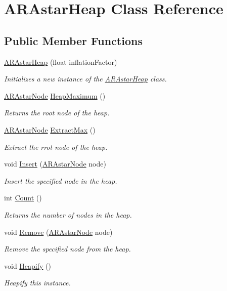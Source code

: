 \hypertarget{class_a_r_astar_heap}{\section{A\-R\-Astar\-Heap Class Reference}
\label{class_a_r_astar_heap}
}
\subsection*{Public Member Functions}
\begin{DoxyCompactItemize}
\item 
\hyperlink{class_a_r_astar_heap_a699bf0a23b37f6f30ff2c04d2d445740}{A\-R\-Astar\-Heap} (float inflation\-Factor)
\begin{DoxyCompactList}\small\item\em Initializes a new instance of the \hyperlink{class_a_r_astar_heap}{A\-R\-Astar\-Heap} class. \end{DoxyCompactList}\item 
\hyperlink{class_a_r_astar_node}{A\-R\-Astar\-Node} \hyperlink{class_a_r_astar_heap_aeb5fa05fb217b9650d2cd62b105b9a25}{Heap\-Maximum} ()
\begin{DoxyCompactList}\small\item\em Returns the root node of the heap. \end{DoxyCompactList}\item 
\hyperlink{class_a_r_astar_node}{A\-R\-Astar\-Node} \hyperlink{class_a_r_astar_heap_a535db2f13d9af1e23757671601ad0f70}{Extract\-Max} ()
\begin{DoxyCompactList}\small\item\em Extract the rrot node of the heap. \end{DoxyCompactList}\item 
void \hyperlink{class_a_r_astar_heap_a3ec8e0df935cb41937a202061caac700}{Insert} (\hyperlink{class_a_r_astar_node}{A\-R\-Astar\-Node} node)
\begin{DoxyCompactList}\small\item\em Insert the specified node in the heap. \end{DoxyCompactList}\item 
int \hyperlink{class_a_r_astar_heap_a9ee6d644c983c0155159ee5ffa4d2801}{Count} ()
\begin{DoxyCompactList}\small\item\em Returns the number of nodes in the heap. \end{DoxyCompactList}\item 
void \hyperlink{class_a_r_astar_heap_aae69fc99cd7df772bbfcfb6f3431c2ae}{Remove} (\hyperlink{class_a_r_astar_node}{A\-R\-Astar\-Node} node)
\begin{DoxyCompactList}\small\item\em Remove the specified node from the heap. \end{DoxyCompactList}\item 
void \hyperlink{class_a_r_astar_heap_a700bc67c2fb4973bc75e3e9ad0fc4bca}{Heapify} ()
\begin{DoxyCompactList}\small\item\em Heapify this instance. \end{DoxyCompactList}\end{DoxyCompactItemize}
